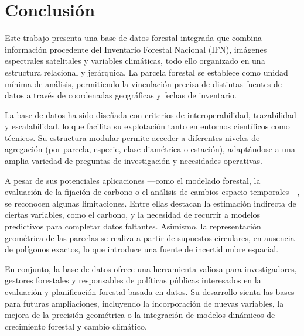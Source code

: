 \section{Conclusión}


Este trabajo presenta una base de datos forestal integrada que combina información procedente del Inventario Forestal Nacional (IFN), imágenes espectrales satelitales y variables climáticas, todo ello organizado en una estructura relacional y jerárquica. La parcela forestal se establece como unidad mínima de análisis, permitiendo la vinculación precisa de distintas fuentes de datos a través de coordenadas geográficas y fechas de inventario.

\medskip

La base de datos ha sido diseñada con criterios de interoperabilidad, trazabilidad y escalabilidad, lo que facilita su explotación tanto en entornos científicos como técnicos. Su estructura modular permite acceder a diferentes niveles de agregación (por parcela, especie, clase diamétrica o estación), adaptándose a una amplia variedad de preguntas de investigación y necesidades operativas.

\medskip

A pesar de sus potenciales aplicaciones —como el modelado forestal, la evaluación de la fijación de carbono o el análisis de cambios espacio-temporales—, se reconocen algunas limitaciones. Entre ellas destacan la estimación indirecta de ciertas variables, como el carbono, y la necesidad de recurrir a modelos predictivos para completar datos faltantes. Asimismo, la representación geométrica de las parcelas se realiza a partir de supuestos circulares, en ausencia de polígonos exactos, lo que introduce una fuente de incertidumbre espacial.

\medskip

En conjunto, la base de datos ofrece una herramienta valiosa para investigadores, gestores forestales y responsables de políticas públicas interesados en la evaluación y planificación forestal basada en datos. Su desarrollo sienta las bases para futuras ampliaciones, incluyendo la incorporación de nuevas variables, la mejora de la precisión geométrica o la integración de modelos dinámicos de crecimiento forestal y cambio climático.
